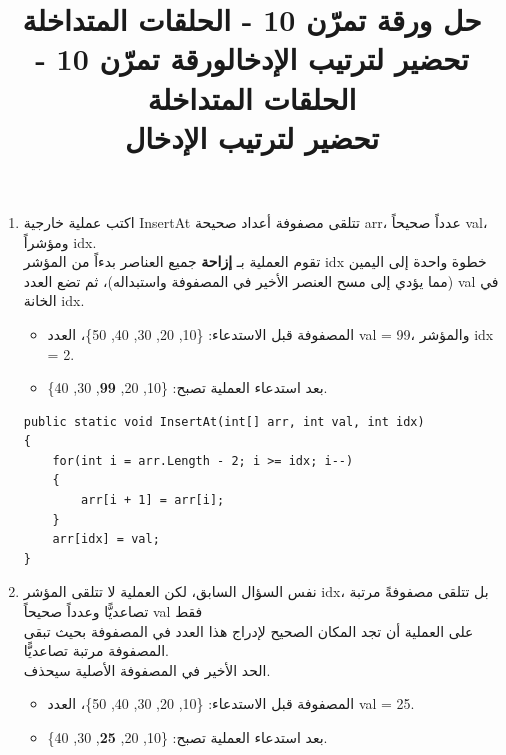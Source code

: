 \documentclass[14pt]{extarticle}
\title{حل ورقة تمرّن 10 - الحلقات المتداخلة \\ تحضير لترتيب الإدخال}
\title{ورقة تمرّن 10 - الحلقات المتداخلة \\ تحضير لترتيب الإدخال}
\begin{document}
\maketitle
\thispagestyle{fancy}

\begin{enumerate}[itemsep=2em]
    \item
    اكتب عملية خارجية \textenglish{InsertAt} تتلقى مصفوفة أعداد صحيحة \textenglish{arr}، عدداً صحيحاً \textenglish{val}، ومؤشراً \textenglish{idx}. \\
    تقوم العملية بـ \textbf{إزاحة} جميع العناصر بدءاً من المؤشر \textenglish{idx} خطوة واحدة إلى اليمين (مما يؤدي إلى مسح العنصر الأخير في المصفوفة واستبداله)، ثم تضع العدد \textenglish{val} في الخانة \textenglish{idx}.

    \begin{boxExample}
    \begin{itemize}
        \item المصفوفة قبل الاستدعاء: \textenglish{\{10, 20, 30, 40, 50\}}، العدد \textenglish{val = 99}، والمؤشر \textenglish{idx = 2}.
        \item بعد استدعاء العملية تصبح: \textenglish{\{10, 20, \textbf{99}, 30, 40\}}.
    \end{itemize}
    \end{boxExample}

    \ifwithsols
    \begin{boxSolution}
    \begin{english}
    \begin{verbatim}
public static void InsertAt(int[] arr, int val, int idx)
{
    for(int i = arr.Length - 2; i >= idx; i--)
    {
        arr[i + 1] = arr[i];
    }
    arr[idx] = val;
}
    \end{verbatim}
    \end{english}
    \end{boxSolution}
    \clearpage
    \fi

    \item
    نفس السؤال السابق، لكن العملية لا تتلقى المؤشر \textenglish{idx}، بل تتلقى مصفوفةً مرتبة تصاعديًّا وعدداً صحيحاً \textenglish{val} فقط \\
    على العملية أن تجد المكان الصحيح لإدراج هذا العدد في المصفوفة بحيث تبقى المصفوفة مرتبة تصاعديًّا. \\
    الحد الأخير في المصفوفة الأصلية سيحذف.

    \begin{boxExample}
    \begin{itemize}
        \item المصفوفة قبل الاستدعاء: \textenglish{\{10, 20, 30, 40, 50\}}، العدد \textenglish{val = 25}.
        \item بعد استدعاء العملية تصبح: \textenglish{\{10, 20, \textbf{25}, 30, 40\}}.
    \end{itemize}
    \end{boxExample}


\end{enumerate}
\end{document}
